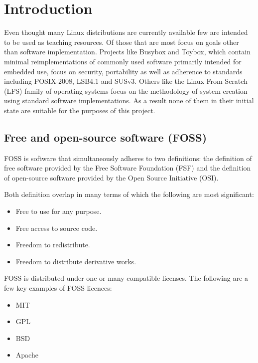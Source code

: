 \section{Introduction}\label{Introduction}

Even thought many Linux distributions are currently available few are intended to be used as teaching resources. Of those that are most focus on goals other than software implementation. Projects like Busybox and Toybox, which contain minimal reimplementations of commonly used software primarily intended for embedded use, focus on security, portability as well as adherence to standards including POSIX-2008, LSB4.1 and SUSv3. Others like the Linux From Scratch (LFS) family of operating systems focus on the methodology of system creation using standard software implementations. As a result none of them in their initial state are suitable for the purposes of this project.

\subsection{Free and open-source software (FOSS)}

FOSS is software that simultaneously adheres to two definitions: the definition of free software provided by the Free Software Foundation (FSF) and the definition of open-source software provided by the Open Source Initiative (OSI).

Both definition overlap in many terms of which the following are most significant:

\begin{itemize}
    \item Free to use for any purpose.
    \item Free access to source code.
    \item Freedom to redistribute.
    \item Freedom to distribute derivative works.
\end{itemize}

FOSS is distributed under one or many compatible licenses. The following are a few key examples of FOSS licences:

\begin{itemize}
    \item MIT
    \item GPL
    \item BSD
    \item Apache
\end{itemize}

